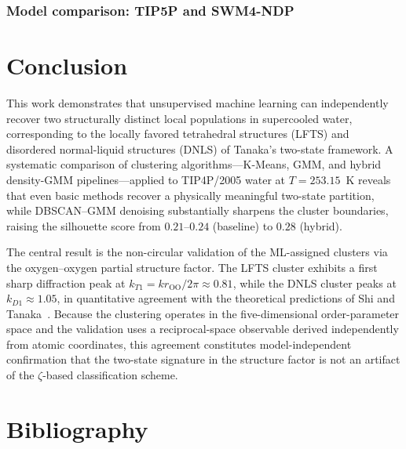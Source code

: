 \documentclass[aps, amsmath,amssymb, reprint, onecolumn,notitlepage,superscriptaddress]{revtex4-2}
\begin{document}
\subsubsection{Model comparison: TIP5P and SWM4-NDP}

\section{Conclusion}
\label{sec:conclusion}
This work demonstrates that unsupervised machine learning can independently recover two structurally distinct local populations in supercooled water, corresponding to the locally favored tetrahedral structures (LFTS) and disordered normal-liquid structures (DNLS) of Tanaka's two-state
framework. A systematic comparison of clustering algorithms---K-Means, GMM, and hybrid density-GMM pipelines---applied to TIP4P/2005 water at $T = 253.15$~K reveals that even basic methods recover a physically meaningful two-state partition, while DBSCAN--GMM denoising substantially sharpens the cluster boundaries, raising the silhouette score from $0.21$--$0.24$ (baseline) to $0.28$ (hybrid).

The central result is the non-circular validation of the ML-assigned clusters via the oxygen--oxygen partial structure factor. The LFTS cluster exhibits a first sharp diffraction peak at $k_{T1} = kr_{\mathrm{OO}}/2\pi \approx 0.81$, while the DNLS cluster peaks at $k_{D1} \approx 1.05$, in quantitative agreement with the theoretical predictions of Shi and Tanaka~\cite{shi_direct_2020}. Because the clustering operates in the five-dimensional order-parameter space and the validation uses a reciprocal-space observable derived independently from atomic coordinates, this agreement constitutes model-independent confirmation that the two-state signature in the structure factor is not an artifact of the $\zeta$-based classification scheme.

\newpage
\section{Bibliography}


\end{document}
